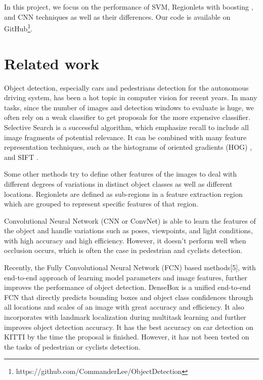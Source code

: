 \documentclass{article} %
\begin{document}
In this project, we focus on the performance of SVM, Regionlets with boosting \cite{Wang2013}, and CNN techniques as well as their differences. Our code is available on GitHub\footnote{https://github.com/CommanderLee/ObjectDetection}.

\section{Related work}

Object detection, especially cars and pedestrians detection for the autonomous driving system, has been a hot topic in computer vision for recent years. In many tasks, since the number of images and detection windows to evaluate is huge, we often rely on a weak classifier to get proposals for the more expensive classifier. Selective Search \cite{van2011segmentation} is a successful algorithm, which emphasize recall to include all image fragments of potential relevance. It can be combined with many feature representation techniques, such as the histograms of oriented gradients (HOG) \cite{dalal2005histograms}, and SIFT \cite{lowe2004distinctive}. 

Some other methods try to define other features of the images to deal with different degrees of variations in distinct object classes as well as different locations. Regionlets \cite{Wang2013} are defined as sub-regions in a feature extraction region which are grouped to represent specific features of that region.

Convolutional Neural Network (CNN or ConvNet) \cite{Krizhevsky2012} is able to learn the features of the object and handle variations such as poses, viewpoints, and light conditions, with high accuracy and high efficiency. However, it doesn't perform well when occlusion occurs, which is often the case in pedestrian and cyclists detection. 

Recently, the Fully Convolutional Neural Network (FCN) based methods[5], with end-to-end approach of learning model parameters and image features, further improves the performance of object detection. DenseBox \cite{Huang2015} is a unified end-to-end FCN that
directly predicts bounding boxes and object class confidences through all locations
and scales of an image with great accuracy and efficiency. It also incorporates with landmark localization during multitask learning and further improves
object detection accuracy. It has the best accuracy on car detection on KITTI by the time the proposal is finished. However, it has not been tested on the tasks of pedestrian or cyclists detection.
\end{document}
